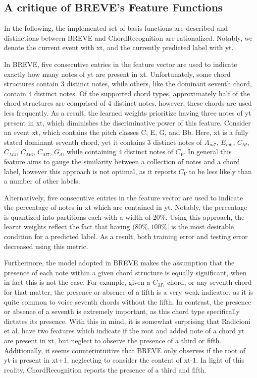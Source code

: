 \documentclass{article} %
\begin{document}
\subsection{A critique of BREVE's Feature Functions}

In the following, the implemented set of basis functions are described and distinctions between BREVE and ChordRecognition are rationalized. Notably, we denote the current event with xt, and the currently predicted label with yt.

In BREVE, five consecutive entries in the feature vector are used to indicate exactly how many notes of yt are present in xt. Unfortunately, some chord structures contain 3 distinct notes, while others, like the dominant seventh chord, contain 4 distinct notes. Of the supported chord types, approximately half of the chord structures are comprised of 4 distinct notes, however, these chords are used less frequently. As a result, the learned weights prioritize having three notes of yt present in xt, which diminishes the discriminative power of this feature. Consider an event xt, which contains the pitch classes C, E, G, and Bb. Here, xt is a fully stated dominant seventh chord, yet it contains 3 distinct notes of $A_{m7}$, $E_{m6}$, $C_{M}$, $C_{M4}$, $C_{M6}$, $C_{M7}$, $G_{d}$, while containing 4 distinct notes of $C_{V}$. In general this feature aims to gauge the similarity between a collection of notes and a chord label, however this approach is not optimal, as it reports $C_V$ to be less likely than a number of other labels.

Alternatively, five consecutive entries in the feature vector are used to indicate the percentage of notes in xt which are contained in yt. Notably, the percentage is quantized into partitions each with a width of 20\%. Using this approach, the learnt weights reflect the fact that having $(80\%, 100\%]$ is the most desirable condition for a predicted label. As a result, both training error and testing error decreased using this metric.

Furthermore, the model adopted in BREVE makes the assumption that the presence of each note within a given chord structure is equally significant, when in fact this is not the case. For example, given a $C_{M7}$ chord, or any seventh chord for that matter, the presence or absence of a fifth is a very weak indicator, as it is quite common to voice seventh chords without the fifth. In contrast, the presence or absence of a seventh is extremely important, as this chord type specifically dictates its presence. With this in mind, it is somewhat surprising that Radicioni et al. have two features which indicate if the root and added note of a chord yt are present in xt, but neglect to observe the presence of a third or fifth. Additionally, it seems counterintuitive that BREVE only observes if the root of yt is present in xt+1, neglecting to consider the content of xt-1. In light of this reality, ChordRecognition reports the presence of a third and fifth.
\end{document}
